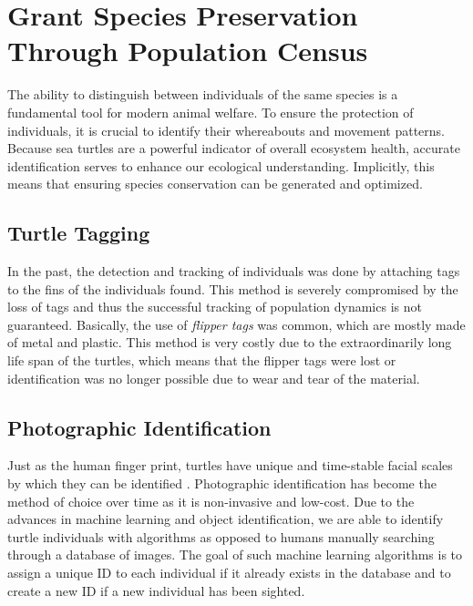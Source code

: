 \section{Grant Species Preservation Through Population Census}


The ability to distinguish between individuals of the same species is a fundamental tool for modern animal welfare. To ensure the protection of individuals, it is crucial to identify their whereabouts and movement patterns. Because sea turtles are a powerful indicator of overall ecosystem health, accurate identification serves to enhance our ecological understanding. Implicitly, this means that ensuring species conservation can be generated and optimized.  


\subsection{Turtle Tagging}
In the past, the detection and tracking of individuals was done by attaching tags to the fins of the individuals found. This method is severely compromised by the loss of tags and thus the successful tracking of population dynamics is not guaranteed. Basically, the use of \emph{flipper tags} was common, which are mostly made of metal and plastic. This method is very costly due to the extraordinarily long life span of the turtles, which means that the flipper tags were lost or identification was no longer possible due to wear and tear of the material.


\subsection{Photographic Identification}
Just as the human finger print, turtles have unique and time-stable facial scales by which they can be identified \cite{Carpentier2016}. Photographic identification has become the method of choice over time as it is non-invasive and low-cost. Due to the advances in machine learning and object identification, we are able to identify turtle individuals with algorithms as opposed to humans manually searching through a database of images. The goal of such machine learning algorithms is to assign a unique ID to each individual if it already exists in the database and to create a new ID if a new individual has been sighted.